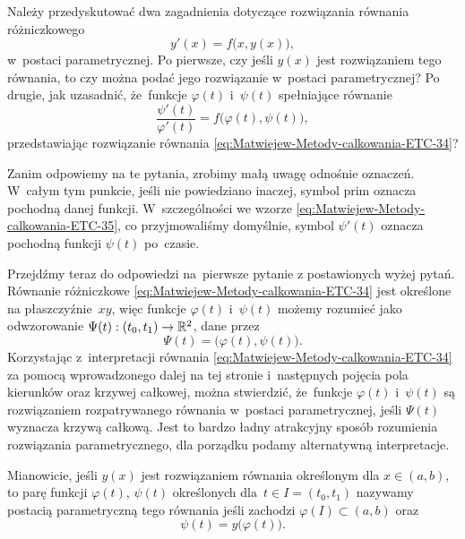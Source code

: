 \documentclass[a4paper,11pt]{article}
\numberwithin{equation}{section}
\begin{document}
\VerSpaceFour





\noindent
{} Należy przedyskutować dwa zagadnienia dotyczące rozwiązania
równania różniczkowego
\begin{equation}
  \label{eq:Matwiejew-Metody-calkowania-ETC-34}
  y'( x ) = f\big( x, y( x ) \big),
\end{equation}
w~postaci parametrycznej. Po pierwsze, czy jeśli $y( x )$ jest rozwiązaniem
tego równania, to czy można podać jego rozwiązanie w~postaci parametrycznej?
Po drugie, jak uzasadnić, że~funkcje $\varphi( t )$ i~$\psi( t )$ spełniające
równanie
\begin{equation}
  \label{eq:Matwiejew-Metody-calkowania-ETC-35}
  \frac{ \psi'( t ) }{ \varphi'( t ) } =
  f\big( \varphi( t ), \psi( t ) \big),
\end{equation}
przedstawiając rozwiązanie równania
\eqref{eq:Matwiejew-Metody-calkowania-ETC-34}?

Zanim odpowiemy na te pytania, zrobimy małą uwagę odnośnie oznaczeń.
W~całym tym punkcie, jeśli nie powiedziano inaczej, symbol prim oznacza
pochodną danej funkcji. W~szczególności we wzorze
\eqref{eq:Matwiejew-Metody-calkowania-ETC-35}, co przyjmowaliśmy domyślnie,
symbol $\psi'( t )$ oznacza pochodną funkcji $\psi( t )$ po~czasie.

Przejdźmy teraz do odpowiedzi na~pierwsze pytanie z postawionych wyżej
pytań. Równanie różniczkowe \eqref{eq:Matwiejew-Metody-calkowania-ETC-34}
jest określone na płaszczyźnie~$xy$, więc funkcje $\varphi( t )$ i~$\psi( t )$ możemy
rozumieć jako odwzorowanie $\Psi( t ) : ( t_{ 0 }, t_{ 1 } ) \to \mathbb{R}^{ 2 }$, dane
przez
\begin{equation}
  \label{eq:Matwiejew-Metody-calkowania-ETC-36}
  \Psi( t ) = \big( \varphi( t ), \psi( t ) \big).
\end{equation}
Korzystając z~interpretacji równania
\eqref{eq:Matwiejew-Metody-calkowania-ETC-34} za pomocą wprowadzonego dalej
na tej stronie i~następnych pojęcia pola kierunków oraz krzywej całkowej,
można stwierdzić, że~funkcje $\varphi( t )$ i~$\psi( t )$ są rozwiązaniem
rozpatrywanego równania w~postaci parametrycznej, jeśli $\Psi( t )$ wyznacza
krzywą całkową. Jest to bardzo ładny atrakcyjny sposób rozumienia
rozwiązania parametrycznego, dla porządku podamy alternatywną interpretacje.

Mianowicie, jeśli $y( x )$ jest rozwiązaniem równania określonym dla
$x \in ( a, b )$, to parę funkcji $\varphi( t )$, $\psi( t )$ określonych
dla~$t \in I = ( t_{ 0 }, t_{ 1 } )$ nazywamy postacią parametryczną tego
równania jeśli zachodzi $\varphi( I ) \subset ( a, b )$ oraz
\begin{equation}
  \label{eq:Matwiejew-Metody-calkowania-ETC-37}
  \psi( t ) = y\big( \varphi( t ) \big).
\end{equation}
\end{document}
